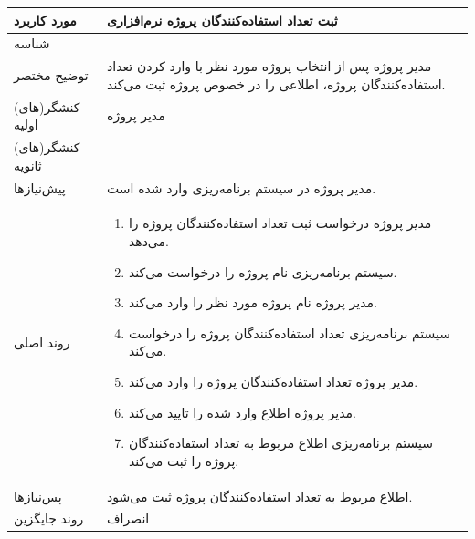 \begin{table}[H]
	\centering
	\begin{tabular}{|p{3cm}|p{10cm}|}
		\hline
		
		
		مورد کاربرد	& ثبت تعداد استفاده‌کنندگان پروژه نرم‌افزاری  \\
		\hline
		
		شناسه & 
		\stepcounter{usecase_ID}
		
		\arabic{usecase_ID} \\
		
		\hline
		
		توضیح مختصر & مدیر پروژه پس از انتخاب پروژه مورد نظر با وارد کردن تعداد استفاده‌کنندگان پروژه، اطلاعی را در خصوص پروژه ثبت می‌کند. \\
		\hline
		
		کنشگر(های) اولیه& مدیر پروژه \\
		\hline
		
		کنشگر(های) ثانویه&  \\
		\hline
		
		پیش‌نیازها
		& مدیر پروژه در سیستم برنامه‌ریزی وارد شده است.\\		
		\hline
		
		
		روند اصلی &
		\begin{enumerate}[topsep=0cm,leftmargin=0.5cm]
			\item مدیر پروژه درخواست ثبت تعداد استفاده‌کنندگان پروژه را می‌دهد.
			\item سیستم برنامه‌ریزی نام پروژه را درخواست می‌کند.
			\item مدیر پروژه نام پروژه مورد نظر را وارد می‌کند.
			\item سیستم برنامه‌ریزی تعداد استفاده‌کنندگان پروژه را درخواست می‌کند.
			\item مدیر پروژه تعداد استفاده‌کنندگان پروژه را وارد می‌کند.
			\item مدیر پروژه اطلاع وارد شده را تایید می‌کند.
			\item سیستم برنامه‌ریزی اطلاع مربوط به تعداد استفاده‌کنندگان پروژه را ثبت می‌کند.
		\end{enumerate}\\
		
		\hline
		
		پس‌نیازها &
		اطلاع مربوط به تعداد استفاده‌کنندگان پروژه ثبت می‌شود. \\
		\hline
		
		روند جایگزین
		& انصراف \\
		\hline
		
	\end{tabular}
\end{table}

